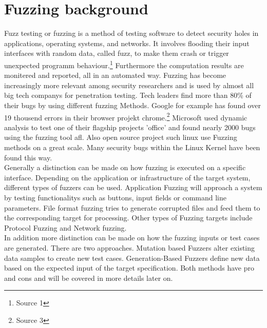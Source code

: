 \documentclass[journal=tosc,final]{iacrtrans}
\begin{document}
\section{Fuzzing background}
Fuzz testing or fuzzing is a method of testing software to detect security holes in applications, operating systems, and networks. It involves flooding their input interfaces with random data, called fuzz, to make them crash or trigger unexpected programm behaviour.\footnote{Source 1} Furthermore the computation results are monitered and reported, all in an automated way. Fuzzing has become increasingly more relevant among security researchers and is used by almost all big tech companys for penetration testing. Tech leaders find more than 80\% of their bugs by using different fuzzing Methods. Google for example  has found over 19 thousend errors in their browser projekt chrome.\footnote{Source 3} Microsoft used dynamic analysis to test one of their flagship projects 'office' and found nearly 2000 bugs using the fuzzing tool afl. Also open source project such linux use Fuzzing methods on a great scale. Many security bugs within the Linux Kernel have been found this way.\\
Generally a distinction can be made on how fuzzing is executed on a specific interface. Depending on the application or infrastructure of the target system, different types of fuzzers can be used. Application Fuzzing will approach a system by testing functionalitys such as buttons, input fields or command line parameters. File format fuzzing tries to generate corrupted files and feed them to the corresponding target for processing. Other types of Fuzzing targets include Protocol Fuzzing and Network fuzzing.\\
In addition more distinction can be made on how the fuzzing inputs or test cases are generated. There are two approaches. Mutation based Fuzzers alter existing data samples to create new test cases. Generation-Based Fuzzers define new data based on the expected input of the target specification. Both methods have pro and cons and will be covered in more details later on.
\end{document}
